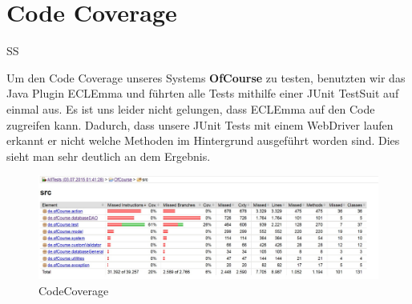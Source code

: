 \chapter{Code Coverage}
\begin{tiny}
	SS
\end{tiny}


Um den Code Coverage unseres Systems \textbf{OfCourse} zu testen, benutzten wir das Java Plugin ECLEmma und führten alle Tests mithilfe einer JUnit TestSuit auf einmal aus.
Es ist uns leider nicht gelungen, dass ECLEmma auf den Code zugreifen kann. Dadurch, dass unsere JUnit Tests mit einem WebDriver laufen erkannt er nicht welche Methoden im Hintergrund ausgeführt worden sind. 
Dies sieht man sehr deutlich an dem Ergebnis.

\begin{figure}[h]
\centering
\includegraphics[width=1\linewidth]{img/CodeCoverage}
\caption{CodeCoverage}
\label{fig:CodeCoverage}
\end{figure}
